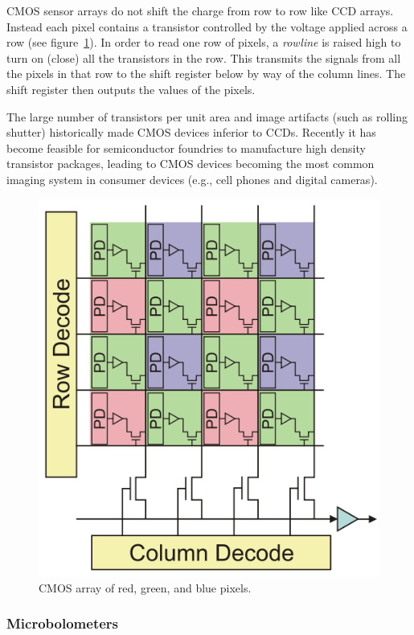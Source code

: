 CMOS sensor arrays do not shift the charge from row to row like CCD arrays.
%
Instead each pixel contains a transistor controlled by the voltage applied across a row (see figure~\ref{fig:cmosarray}).
%
In order to read one row of pixels, a \textit{rowline} is raised high to turn on (close) all the transistors in the row.
%
This transmits the signals from all the pixels in that row to the shift register below by way of the column lines.
%
The shift register then outputs the values of the pixels.

The large number of transistors per unit area and image artifacts (such as rolling shutter) historically made CMOS devices inferior to CCDs.
%
Recently it has become feasible for semiconductor foundries to manufacture high density transistor packages, leading to CMOS devices becoming the most common imaging system in consumer devices (e.g., cell phones and digital cameras).
\begin{figure}[!htbp]
	\center
	\includegraphics[width=.8\linewidth,keepaspectratio]{figures/background/cmos.png}
	\caption{CMOS array of red, green, and blue pixels.}
	\label{fig:cmosarray}
\end{figure}

\subsubsection{Microbolometers}

